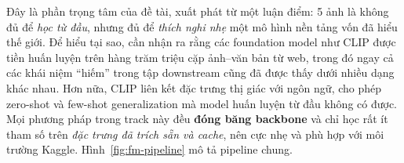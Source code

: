 Đây là phần trọng tâm của đề tài, xuất phát từ một luận điểm: 5 ảnh là không đủ để \emph{học từ
đầu}, nhưng đủ để \emph{thích nghi nhẹ} một mô hình nền tảng vốn đã hiểu thế giới. Để hiểu tại sao,
cần nhận ra rằng các foundation model như CLIP được tiền huấn luyện trên hàng trăm triệu cặp
ảnh--văn bản từ web, trong đó ngay cả các khái niệm ``hiếm'' trong tập downstream cũng đã được thấy
dưới nhiều dạng khác nhau. Hơn nữa, CLIP liên kết đặc trưng thị giác với ngôn ngữ, cho phép
zero-shot và few-shot generalization mà model huấn luyện từ đầu không có được. Mọi phương pháp trong
track này đều \textbf{đóng băng backbone} và chỉ học rất ít tham số trên \emph{đặc trưng đã trích
sẵn và cache}, nên cực nhẹ và phù hợp với môi trường Kaggle. Hình~\ref{fig:fm-pipeline} mô tả
pipeline chung.


